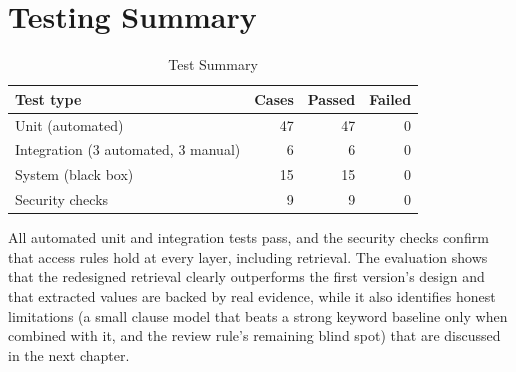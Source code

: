 \section{Testing Summary}
\begin{table}[H]\centering
\caption{Test Summary}\label{tab:testsummary}
\begin{tabular}{|l|r|r|r|}\hline
\textbf{Test type} & \textbf{Cases} & \textbf{Passed} & \textbf{Failed} \\ \hline
Unit (automated) & 47 & 47 & 0 \\ \hline
Integration (3 automated, 3 manual) & 6 & 6 & 0 \\ \hline
System (black box) & 15 & 15 & 0 \\ \hline
Security checks & 9 & 9 & 0 \\ \hline
\end{tabular}
\end{table}
All automated unit and integration tests pass, and the security checks confirm that access rules hold at
every layer, including retrieval. The evaluation shows that the redesigned retrieval clearly outperforms
the first version's design and that extracted values are backed by real evidence, while it also
identifies honest limitations (a small clause model that beats a strong keyword baseline only when combined with it, and the review rule's remaining blind spot)
that are discussed in the next chapter.
